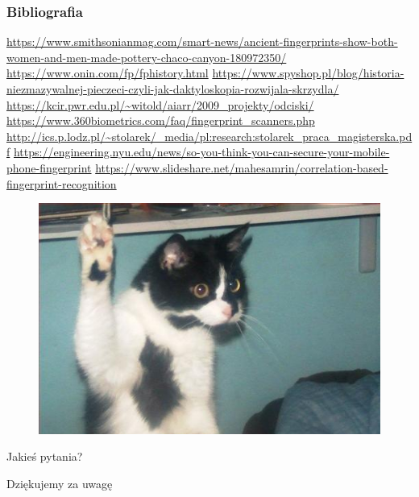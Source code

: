\documentclass{beamer}
\begin{document}
\begin{frame}[allowframebreaks]
    \frametitle{Bibliografia}
    \begin{thebibliography}{6}
        \tiny
        \url{https://www.smithsonianmag.com/smart-news/ancient-fingerprints-show-both-women-and-men-made-pottery-chaco-canyon-180972350/}
        \url{https://www.onin.com/fp/fphistory.html}
        \url{https://www.spyshop.pl/blog/historia-niezmazywalnej-pieczeci-czyli-jak-daktyloskopia-rozwijala-skrzydla/}
        \bibitem{}
        \url{https://kcir.pwr.edu.pl/~witold/aiarr/2009_projekty/odciski/}
        \bibitem{}
        \url{https://www.360biometrics.com/faq/fingerprint_scanners.php}
        \bibitem{}
        \url{http://ics.p.lodz.pl/~stolarek/_media/pl:research:stolarek_praca_magisterska.pdf}
        \bibitem{}
        \url{https://engineering.nyu.edu/news/so-you-think-you-can-secure-your-mobile-phone-fingerprint}
        \bibitem{}
        \url{https://www.slideshare.net/mahesamrin/correlation-based-fingerprint-recognition}
    \end{thebibliography}
\end{frame}

\begin{frame}
    \centering
    \begin{figure}[t]
        \centering
        \includegraphics[width=0.75\linewidth]{questions.png}
    \end{figure}
    \smallskip
    \Large
    Jakieś pytania?
\end{frame}

\begin{frame}
    \centering
    \huge
    Dziękujemy za uwagę
\end{frame}
\end{document}
